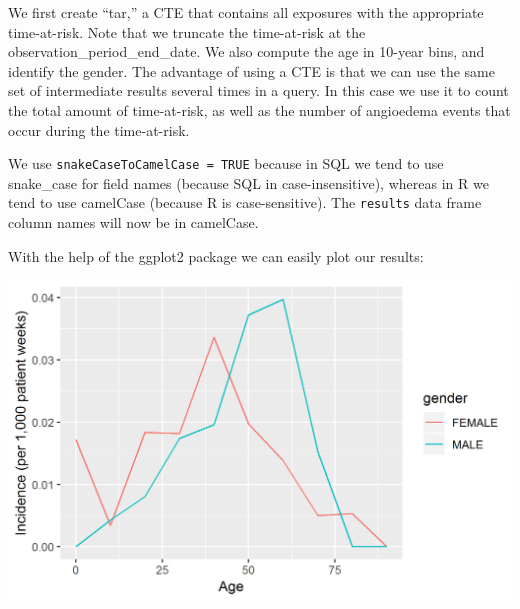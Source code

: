 \documentclass[11pt]{book}
\newenvironment{Shaded}{\begin{snugshade}}{\end{snugshade}}
\newcommand{\CommentTok}[1]{\textcolor[rgb]{0.56,0.35,0.01}{\textit{#1}}}
\newcommand{\DataTypeTok}[1]{\textcolor[rgb]{0.13,0.29,0.53}{#1}}
\newcommand{\DecValTok}[1]{\textcolor[rgb]{0.00,0.00,0.81}{#1}}
\newcommand{\KeywordTok}[1]{\textcolor[rgb]{0.13,0.29,0.53}{\textbf{#1}}}
\newcommand{\NormalTok}[1]{#1}
\newcommand{\OperatorTok}[1]{\textcolor[rgb]{0.81,0.36,0.00}{\textbf{#1}}}
\newcommand{\StringTok}[1]{\textcolor[rgb]{0.31,0.60,0.02}{#1}}
\theoremstyle{definition}
\theoremstyle{definition}
\theoremstyle{definition}
\theoremstyle{remark}
\begin{document}
We first create ``tar,'' a CTE that contains all exposures with the appropriate time-at-risk. Note that we truncate the time-at-risk at the observation\_period\_end\_date. We also compute the age in 10-year bins, and identify the gender. The advantage of using a CTE is that we can use the same set of intermediate results several times in a query. In this case we use it to count the total amount of time-at-risk, as well as the number of angioedema events that occur during the time-at-risk.

We use \texttt{snakeCaseToCamelCase\ =\ TRUE} because in SQL we tend to use snake\_case for field names (because SQL in case-insensitive), whereas in R we tend to use camelCase (because R is case-sensitive). The \texttt{results} data frame column names will now be in camelCase.

With the help of the ggplot2 package we can easily plot our results:

\begin{Shaded}
\end{Shaded}

\begin{center}\includegraphics[width=0.8\linewidth]{images/SqlAndR/ir} \end{center}
\end{document}
